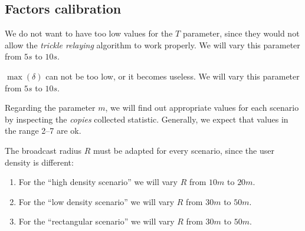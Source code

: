 \subsection{Factors calibration}\label{subsec:calibration}

We do not want to have too low values for the \(T\) parameter, since they would
not allow the \emph{trickle relaying} algorithm to work properly. We will vary
this parameter from \(5s\) to \(10s\).

\(\max(\delta)\) can not be too low, or it becomes useless. We will vary this
parameter from \(5s\) to \(10s\).

Regarding the parameter \(m\), we will find out appropriate values for each
scenario by inspecting the \textit{copies} collected statistic. Generally, we
expect that values in the range 2--7 are ok.

The broadcast radius \(R\) must be adapted for every scenario, since the user
density is different:
\begin{enumerate}
	\item For the ``high density scenario'' we will vary \(R\) from \(10m\)
		to \(20m\).
	\item For the ``low density scenario'' we will vary \(R\) from \(30m\)
		to \(50m\).
	\item For the ``rectangular scenario'' we will vary \(R\) from \(30m\)
		to \(50m\).
\end{enumerate}
